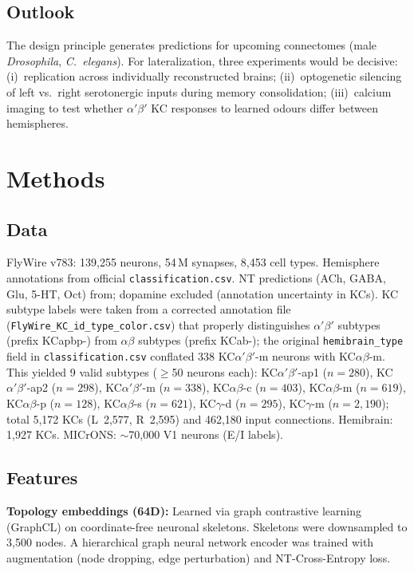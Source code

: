 \documentclass[10pt]{article}
\begin{document}
\subsection*{Outlook}

The design principle generates predictions for upcoming connectomes (male \textit{Drosophila}, \textit{C.~elegans}). For lateralization, three experiments would be decisive: (i)~replication across individually reconstructed brains; (ii)~optogenetic silencing of left vs.\ right serotonergic inputs during memory consolidation; (iii)~calcium imaging to test whether $\alpha'\beta'$ KC responses to learned odours differ between hemispheres.

\section*{Methods}

\subsection*{Data}
FlyWire v783\cite{dorkenwald2024flywire,schlegel2024flywire}: 139,255 neurons, 54\,M synapses, 8,453 cell types. Hemisphere annotations from official \texttt{classification.csv}. NT predictions (ACh, GABA, Glu, 5-HT, Oct) from\cite{eckstein2020neurotransmitter}; dopamine excluded (annotation uncertainty in KCs). KC subtype labels were taken from a corrected annotation file (\texttt{FlyWire\_KC\_id\_type\_color.csv}) that properly distinguishes $\alpha'\beta'$ subtypes (prefix KCapbp-) from $\alpha\beta$ subtypes (prefix KCab-); the original \texttt{hemibrain\_type} field in \texttt{classification.csv} conflated 338 KC$\alpha'\beta'$-m neurons with KC$\alpha\beta$-m. This yielded 9 valid subtypes ($\geq$50 neurons each): KC$\alpha'\beta'$-ap1 ($n=280$), KC$\alpha'\beta'$-ap2 ($n=298$), KC$\alpha'\beta'$-m ($n=338$), KC$\alpha\beta$-c ($n=403$), KC$\alpha\beta$-m ($n=619$), KC$\alpha\beta$-p ($n=128$), KC$\alpha\beta$-s ($n=621$), KC$\gamma$-d ($n=295$), KC$\gamma$-m ($n=2{,}190$); total 5,172 KCs (L~2,577, R~2,595) and 462,180 input connections. Hemibrain\cite{scheffer2020hemibrain}: 1,927 KCs. MICrONS\cite{microns2021cortical}: $\sim$70,000 V1 neurons (E/I labels).

\subsection*{Features}
\textbf{Topology embeddings (64D):} Learned via graph contrastive learning (GraphCL) on coordinate-free neuronal skeletons. Skeletons were downsampled to 3,500 nodes. A hierarchical graph neural network encoder was trained with augmentation (node dropping, edge perturbation) and NT-Cross-Entropy loss.
\end{document}
